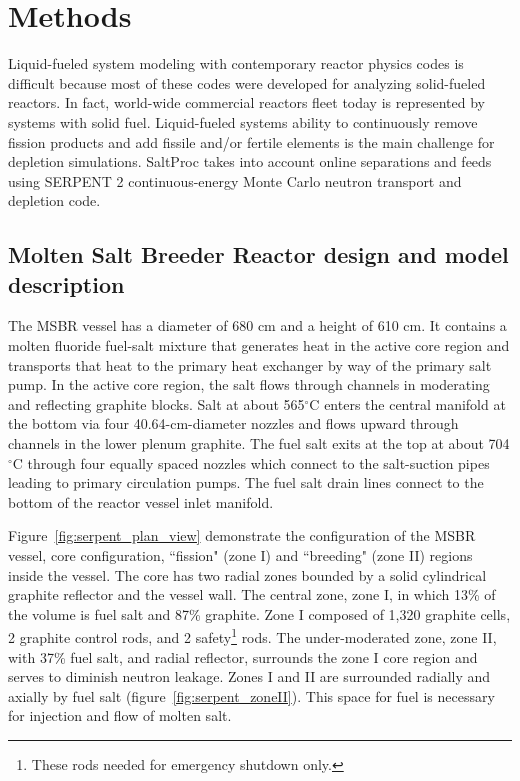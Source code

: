 \section{Methods}

Liquid-fueled system modeling with contemporary reactor physics codes is difficult because most of these codes were developed for analyzing solid-fueled reactors. In fact, world-wide commercial reactors fleet today is represented by systems with solid fuel. Liquid-fueled systems ability to continuously remove fission products and add fissile and/or fertile elements is the main challenge for depletion simulations. SaltProc takes into account online separations and feeds using SERPENT 2 continuous-energy Monte Carlo neutron transport and depletion code.

\subsection{Molten Salt Breeder Reactor design and model description}
The \gls{MSBR} vessel has a diameter of 680 cm and a height of 610 cm. It contains a molten fluoride fuel-salt mixture that generates heat in the active core region and transports that heat to the primary heat exchanger by way of the primary salt pump. In the active core region, the salt flows through channels in moderating and reflecting graphite blocks. Salt at about 565$^{\circ}$C enters the central manifold at the bottom via four 40.64-cm-diameter nozzles and flows upward through channels in the lower plenum graphite. The fuel salt exits at the top at about 704$^{\circ}$C through four equally spaced nozzles which connect to the salt-suction pipes leading to primary circulation pumps. The fuel salt drain lines connect to the bottom of the reactor vessel inlet manifold.

Figure~\ref{fig:serpent_plan_view} demonstrate the configuration of the \gls{MSBR} vessel, core configuration, ``fission" (zone I) and ``breeding" (zone II) regions inside the vessel. The core has two radial zones bounded by a solid cylindrical graphite reflector and the vessel wall. The central zone, zone I, in which 13\% of the volume is fuel salt and 87\% graphite. Zone I composed of 1,320 graphite cells, 2 graphite control rods, and 2 safety\footnote{These rods needed for emergency shutdown only.} rods. The under-moderated zone, zone II, with 37\% fuel salt, and radial reflector, surrounds the zone I core region and serves to diminish neutron leakage. Zones I and II are surrounded radially and axially by fuel salt (figure~\ref{fig:serpent_zoneII}). This space for fuel is necessary for injection and flow of molten salt.

